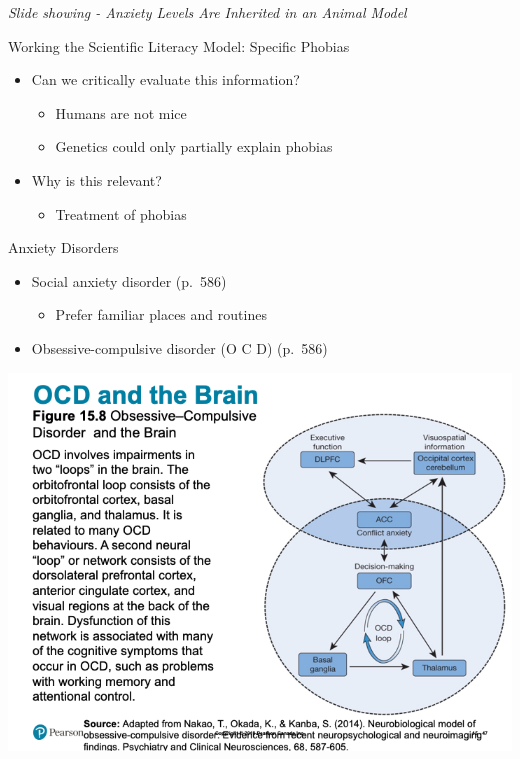 \documentclass[
]{book}
\providecommand{\tightlist}{%
  \setlength{\itemsep}{0pt}\setlength{\parskip}{0pt}}
\begin{document}
\begin{reflect}
\emph{Slide showing - Anxiety Levels Are Inherited in an Animal Model}

Working the Scientific Literacy Model: Specific Phobias

\begin{itemize}
\tightlist
\item
  Can we critically evaluate this information?

  \begin{itemize}
  \tightlist
  \item
    Humans are not mice\\
  \item
    Genetics could only partially explain phobias\\
  \end{itemize}
\item
  Why is this relevant?

  \begin{itemize}
  \tightlist
  \item
    Treatment of phobias
  \end{itemize}
\end{itemize}

Anxiety Disorders

\begin{itemize}
\tightlist
\item
  Social anxiety disorder (p.~586)

  \begin{itemize}
  \tightlist
  \item
    Prefer familiar places and routines\\
  \end{itemize}
\item
  Obsessive-compulsive disorder (O C D) (p.~586)
\end{itemize}

\includegraphics{assets/unit_10/slide_47.png}


\end{reflect}
\end{document}
